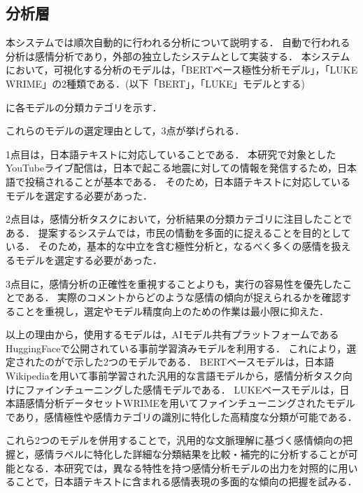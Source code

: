 

  \subsection{分析層}
  本システムでは順次自動的に行われる分析について説明する．
  自動で行われる分析は感情分析であり，外部の独立したシステムとして実装する．
  本システムにおいて，可視化する分析のモデルは，「BERTベース極性分析モデル」\cite{koheiduck_sentiment}，「LUKE WRIME」\cite{luke}の2種類である．(以下「BERT」，「LUKE」モデルとする)

  に各モデルの分類カテゴリを示す．

  \clearpage

  

  これらのモデルの選定理由として，3点が挙げられる．
  
  1点目は，日本語テキストに対応していることである．
  本研究で対象としたYouTubeライブ配信は，日本で起こる地震に対しての情報を発信するため，日本語で投稿されることが基本である．
  そのため，日本語テキストに対応しているモデルを選定する必要があった．

  2点目は，感情分析タスクにおいて，分析結果の分類カテゴリに注目したことである．
  提案するシステムでは，市民の情動を多面的に捉えることを目的としている．
  そのため，基本的な中立を含む極性分析と，なるべく多くの感情を扱えるモデルを選定する必要があった．
  
  3点目に，感情分析の正確性を重視することよりも，実行の容易性を優先したことである．
  実際のコメントからどのような感情の傾向が捉えられるかを確認することを重視し，選定やモデル精度向上のための作業は最小限に抑えた．
  
  以上の理由から，使用するモデルは，AIモデル共有プラットフォームであるHuggingFaceで公開されている事前学習済みモデルを利用する．
  これにより，選定されたのがで示した2つのモデルである．
  BERTベースモデルは，日本語Wikipediaを用いて事前学習された汎用的な言語モデル\cite{bert}から，感情分析タスク向けにファインチューニングした感情モデルである\cite{koheiduck_sentiment}．
  LUKEベースモデルは，日本語感情分析データセットWRIMEを用いてファインチューニングされたモデルであり，感情極性や感情カテゴリの識別に特化した高精度な分類が可能である\cite{luke}．
  
  これら2つのモデルを併用することで，汎用的な文脈理解に基づく感情傾向の把握と，感情ラベルに特化した詳細な分類結果を比較・補完的に分析することが可能となる．本研究では，異なる特性を持つ感情分析モデルの出力を対照的に用いることで，日本語テキストに含まれる感情表現の多面的な傾向の把握を試みる．

